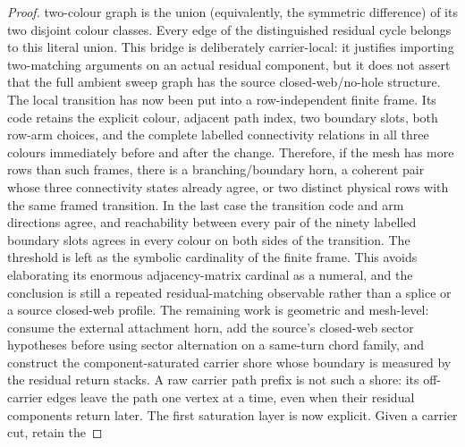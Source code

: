 \begin{proof}
two-colour graph is the union (equivalently, the symmetric difference) of its
two disjoint colour classes.
Every edge of the distinguished residual cycle belongs to this literal union.
This bridge is deliberately carrier-local: it justifies importing
two-matching arguments on an actual residual component, but it does not assert
that the full ambient sweep graph has the source closed-web/no-hole structure.
The local transition has now been put into a row-independent finite frame.  Its
code retains the explicit colour, adjacent path index, two boundary slots, both
row-arm choices, and the complete labelled connectivity relations in all three
colours immediately before and after the change.  Therefore, if the mesh has
more rows than such frames, there is a branching/boundary horn, a coherent pair
whose three connectivity states already agree, or two distinct physical rows
with the same framed transition.  In the last case the transition code and arm
directions agree, and reachability between every pair of the ninety labelled
boundary slots agrees in every colour on both sides of the transition.
The threshold is left as the symbolic cardinality of the finite frame.  This
avoids elaborating its enormous adjacency-matrix cardinal as a numeral, and the
conclusion is still a repeated residual-matching observable rather than a
splice or a source closed-web profile.
The remaining work is geometric and mesh-level: consume the external
attachment horn, add the source's closed-web sector hypotheses before using
sector alternation on a same-turn chord family, and construct the
component-saturated carrier shore whose boundary is measured by the residual
return stacks.  A raw carrier path prefix is not such a shore: its off-carrier
edges leave the path one vertex at a time, even when their residual components
return later.
The first saturation layer is now explicit.  Given a carrier cut, retain the

\end{proof}
